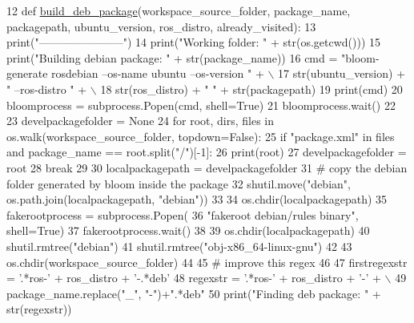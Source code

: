 \begin{DoxyCode}
12 \textcolor{keyword}{def }\hyperlink{namespacegenerate__debs_aa70c3f4917ddc57b13eaed8501f571a8}{build\_deb\_package}(workspace\_source\_folder, package\_name, packagepath, ubuntu\_version, 
      ros\_distro, already\_visited):
13     print(\textcolor{stringliteral}{"-----------------------"})
14     print(\textcolor{stringliteral}{"Working folder: "} + str(os.getcwd()))
15     print(\textcolor{stringliteral}{"Building debian package: "} + str(package\_name))
16     cmd = \textcolor{stringliteral}{"bloom-generate rosdebian --os-name ubuntu --os-version "} + \(\backslash\)
17         str(ubuntu\_version) + \textcolor{stringliteral}{" --ros-distro "} + \(\backslash\)
18         str(ros\_distro) + \textcolor{stringliteral}{" "} + str(packagepath)
19     print(cmd)
20     bloomprocess = subprocess.Popen(cmd, shell=\textcolor{keyword}{True})
21     bloomprocess.wait()
22 
23     develpackagefolder = \textcolor{keywordtype}{None}
24     \textcolor{keywordflow}{for} root, dirs, files \textcolor{keywordflow}{in} os.walk(workspace\_source\_folder, topdown=\textcolor{keyword}{False}):
25         \textcolor{keywordflow}{if} \textcolor{stringliteral}{"package.xml"} \textcolor{keywordflow}{in} files \textcolor{keywordflow}{and} package\_name == root.split(\textcolor{stringliteral}{"/"})[-1]:
26             print(root)
27             develpackagefolder = root
28             \textcolor{keywordflow}{break}
29 
30     localpackagepath = develpackagefolder
31     \textcolor{comment}{# copy the debian folder generated by bloom inside the package}
32     shutil.move(\textcolor{stringliteral}{"debian"}, os.path.join(localpackagepath, \textcolor{stringliteral}{"debian"}))
33 
34     os.chdir(localpackagepath)
35     fakerootprocess = subprocess.Popen(
36         \textcolor{stringliteral}{"fakeroot debian/rules binary"}, shell=\textcolor{keyword}{True})
37     fakerootprocess.wait()
38 
39     os.chdir(localpackagepath)
40     shutil.rmtree(\textcolor{stringliteral}{"debian"})
41     shutil.rmtree(\textcolor{stringliteral}{"obj-x86\_64-linux-gnu"})
42 
43     os.chdir(workspace\_source\_folder)
44 
45     \textcolor{comment}{# improve this regex}
46 
47     firstregexstr = \textcolor{stringliteral}{'.*ros-'} + ros\_distro + \textcolor{stringliteral}{'-.*deb'}
48     regexstr = \textcolor{stringliteral}{'.*ros-'} + ros\_distro + \textcolor{stringliteral}{'-'} + \(\backslash\)
49         package\_name.replace(\textcolor{stringliteral}{"\_"}, \textcolor{stringliteral}{"-"})+\textcolor{stringliteral}{".*deb"}
50     print(\textcolor{stringliteral}{"Finding deb package: "} + str(regexstr))

\end{DoxyCode}
